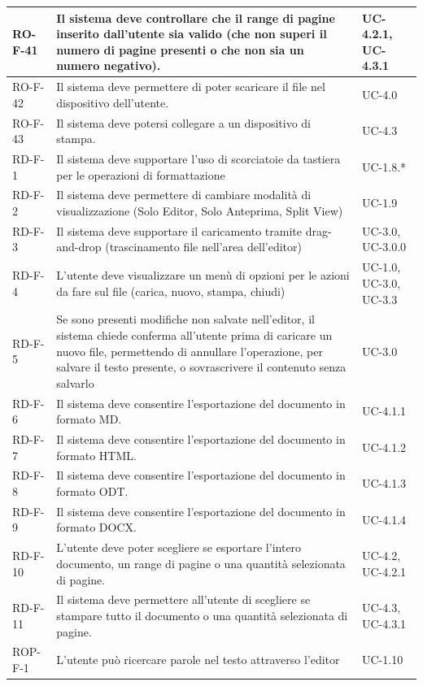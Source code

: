 \documentclass[11pt,a4paper]{article}
\begin{document}
\begin{longtable}{|p{}|>{\raggedright\arraybackslash}p{}|p{}|}
\hline
RO-F-41 & Il sistema deve controllare che il range di pagine inserito dall'utente sia valido (che non superi il numero di pagine presenti o che non sia un numero negativo). & UC-4.2.1, UC-4.3.1\\
\hline
RO-F-42 & Il sistema deve permettere di poter scaricare il file nel dispositivo dell'utente. & UC-4.0\\
\hline
RO-F-43 & Il sistema deve potersi collegare a un dispositivo di stampa. & UC-4.3\\
\hline
RD-F-1 & Il sistema deve supportare l'uso di scorciatoie da tastiera per le operazioni di formattazione & UC-1.8.* \\
\hline
RD-F-2 & Il sistema deve permettere di cambiare modalità di visualizzazione (Solo Editor, Solo Anteprima, Split View) & UC-1.9 \\
\hline
RD-F-3 & Il sistema deve supportare il caricamento tramite drag-and-drop (trascinamento file nell'area dell'editor) & UC-3.0, UC-3.0.0 \\
\hline
RD-F-4 & L'utente deve visualizzare un menù di opzioni per le azioni da fare sul file (carica, nuovo, stampa, chiudi) & UC-1.0, UC-3.0, UC-3.3 \\
\hline
RD-F-5 & Se sono presenti modifiche non salvate nell'editor, il sistema chiede conferma all'utente prima di caricare un nuovo file, permettendo di annullare l'operazione, per salvare il testo presente, o sovrascrivere il contenuto senza salvarlo & UC-3.0 \\
\hline
RD-F-6 & Il sistema deve consentire l'esportazione del documento in formato MD. & UC-4.1.1 \\
\hline
RD-F-7 & Il sistema deve consentire l'esportazione del documento in formato HTML. & UC-4.1.2 \\
\hline
RD-F-8 & Il sistema deve consentire l'esportazione del documento in formato ODT. & UC-4.1.3 \\
\hline
RD-F-9 & Il sistema deve consentire l'esportazione del documento in formato DOCX. & UC-4.1.4 \\
\hline
RD-F-10 & L'utente deve poter scegliere se esportare l'intero documento, un range di pagine o una quantità selezionata di pagine. & UC-4.2, UC-4.2.1\\
\hline
RD-F-11 & Il sistema deve permettere all’utente di scegliere se stampare tutto il documento o una quantità selezionata di pagine. & UC-4.3, UC-4.3.1\\
\hline
ROP-F-1 & L'utente può ricercare parole nel testo attraverso l'editor & UC-1.10 \\

\end{longtable}
\end{document}
